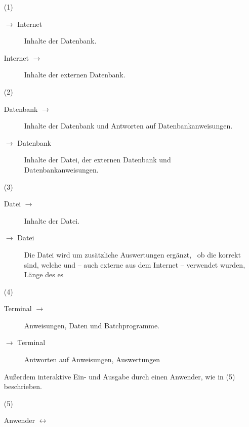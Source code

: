 \begin{itemize}
	\newcommand*{\vonnach}[2]{#1 $\rightarrow$ #2}
	\newcommand*{\nachvon}[2]{\vonnach{#2}{#1}}
	\newcommand*{\hinundher}[2]{#1 $\leftrightarrow$ #2}
	\item[(1)]\label{dat:Internet}
	\begin{description}
		\item[\vonnach{\ASBA}{Internet}]\label{dat:ausInternet}
		Inhalte der Datenbank.
		\item[\nachvon{\ASBA}{Internet}]\label{dat:inInternet}
		Inhalte der externen Datenbank.
	\end{description}
	\item[(2)]\label{dat:Datenbank}
	\begin{description}
		\item[\vonnach{Datenbank}{\ASBA}]\label{dat:ausDatenbank}
		Inhalte der Datenbank und Antworten auf Datenbankanweisungen.
		\item[\nachvon{Datenbank}{\ASBA}]\label{dat:inDatenbank}
		Inhalte der Datei, der externen Datenbank und Datenbankanweisungen.
	\end{description}
	\item[(3)]\label{dat:Datei}
	\begin{description}
		\item[\vonnach{Datei}{\ASBA}]\label{dat:ausDatei}
		Inhalte der Datei.
		\item[\nachvon{Datei}{\ASBA}]\label{dat:inDatei}
		Die Datei wird um zusätzliche Auswertungen ergänzt, \textzB\ ob die  korrekt sind, welche  und  -- auch externe aus dem Internet -- verwendet wurden, Länge des es \textusw
	\end{description}
	\item[(4)]\label{dat:Terminal}
	\begin{description}
		\item[\vonnach{Terminal}{\ASBA}]\label{dat:ausTerminal}
		Anweisungen, Daten und Batchprogramme.
		\item[\nachvon{Terminal}{\ASBA}]\label{dat:inTerminal}
		Antworten auf Anweisungen, Auswertungen \textusw
	\end{description}
	Außerdem interaktive Ein- und Ausgabe durch einen Anwender, wie in (5) beschrieben.
	\item[(5)]\label{dat:Anwender}
	\begin{description}
		\item[\hinundher{Anwender}{\ASBA}]\label{dat:mitAnwender}

\end{description}
\end{itemize}

